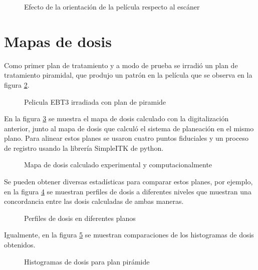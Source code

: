 \begin{figure}
	\centering
	
	\caption{Efecto de la orientación de la película respecto al escáner }
	\label{fig:efectoOrientacion}
\end{figure}

\section{Mapas de dosis}


Como primer plan de tratamiento y a modo de prueba se irradió un plan de tratamiento piramidal, que produjo un patrón en la película que se observa en la figura \ref{fig:piramideEscaneada}.\\
\begin{figure}
	\centering
	
	\caption{Pelicula EBT3 irradiada con plan de piramide }
	\label{fig:piramideEscaneada}
\end{figure}

En la figura \ref{fig:mapaPiramide} se muestra el mapa de dosis calculado con la digitalización anterior, junto al mapa de dosis que calculó el sistema de planeación en el mismo plano. Para alinear estos planes se usaron cuatro puntos fiduciales y un proceso de registro usando la librería SimpleITK de python.\\

\begin{figure}
	\centering
	
	\caption{Mapa de dosis calculado experimental y computacionalmente }
	\label{fig:mapaPiramide}
\end{figure}

Se pueden obtener diversas estadísticas para comparar estos planes, por ejemplo, en la figura \ref{fig:perfilesDosisPiramide} se muestran perfiles de dosis a diferentes niveles que muestran una concordancia entre las dosis calculadas de ambas maneras.\\
\begin{figure}
	\centering
	
	\caption{Perfiles de dosis en diferentes planos }
	\label{fig:perfilesDosisPiramide}
\end{figure}
Igualmente, en la figura \ref{fig:histogramasDosisPiramide} se muestran comparaciones de los histogramas de dosis obtenidos.\\
\begin{figure}
	\centering
	
	\caption{Histogramas de dosis para plan pirámide }
	\label{fig:histogramasDosisPiramide}
\end{figure}

